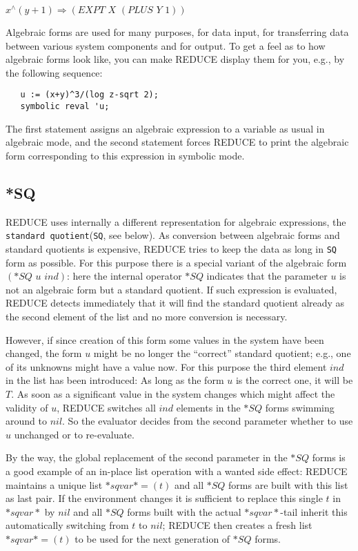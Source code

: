 \documentclass[11pt]{article}
\newcommand{\reduce}{\small REDUCE}
\begin{document}
$x^\wedge (y+1) \Rightarrow (EXPT\,\, X\,\, (PLUS\,\, Y\,\, 1))$

Algebraic forms are used for many purposes, for data input,
for transferring data between various system components and
for output. To get a feel as to how algebraic forms look
like, you can make {\reduce} display them for you, e.g.,
by the following sequence:

\begin{verbatim}
   u := (x+y)^3/(log z-sqrt 2);
   symbolic reval 'u;
\end{verbatim}

The first statement assigns an algebraic expression to a
variable as usual in algebraic mode, and the second statement
forces {\reduce} to print the algebraic form corresponding
to this expression in symbolic mode.

\subsection{*SQ}

{\reduce} uses internally a different
representation for algebraic expressions, the
\texttt{standard quotient}(\texttt{SQ},
see below). As conversion
between algebraic forms and standard quotients is expensive,
{\reduce} tries to keep the data as long in \texttt{SQ}
form as possible. For this purpose there is a special
variant of the algebraic form $(*SQ \,\,  u \,\, ind)$: here the
internal operator $*SQ$ indicates that the parameter $u$
is not an algebraic form but a standard quotient. If such
expression is evaluated, {\reduce} detects
immediately that it will find the standard quotient
already as the second element of the list and no more
conversion is necessary.

However, if since creation of this
form some values in the system have been changed, the
form $u$ might be no longer the ``correct'' standard
quotient; e.g., one of its unknowns might have a value
now. For this purpose the third element $ind$ in the list
has been introduced: As long as the form $u$ is the correct
one, it will be $T$. As soon as a significant value in the
system changes which might affect the validity of $u$,
{\reduce} switches all $ind$ elements in the $*SQ$ forms
swimming around to $nil$. So the evaluator decides from the
second parameter whether to use $u$ unchanged or
to re-evaluate.

By the way, the global replacement of the second parameter
in the $*SQ$ forms is a good example of an in-place
list operation with a wanted side effect:
{\reduce} maintains a unique  list $*sqvar*=(t)$ and all
$*SQ$ forms are built with this list as last pair.
If the environment changes it is sufficient to replace
this single \textbf{$t$} in $*sqvar*$ by $nil$ and all $*SQ$ forms
built with the actual $*sqvar*$-tail inherit this
automatically switching from $t$ to $nil$;
{\reduce} then creates a fresh list $*sqvar*=(t)$
to be used for the next generation of $*SQ$ forms.
\end{document}
